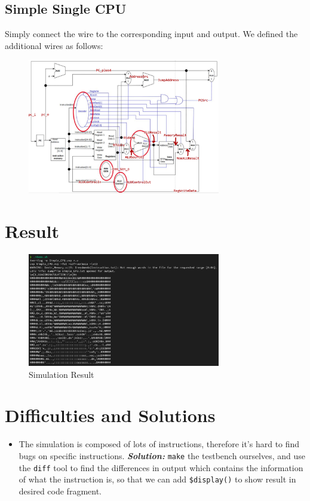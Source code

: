 \documentclass{article}
\begin{document}
\subsection{Simple Single CPU}
Simply connect the wire to the corresponding input and output.
We defined the additional wires as follows:
\begin{figure}[!htb]
    \centering
    \includegraphics[width=0.75\textwidth]{wire.png}
\end{figure}

\newpage

\section{Result}
\begin{figure}[!htb]
    \centering
    \includegraphics[width=0.75\textwidth]{result.png}
    \caption{Simulation Result}
\end{figure}

\section{Difficulties and Solutions}
\begin{itemize}
    \item The simulation is composed of lots of instructions, therefore it's hard to find bugs on specific instructions.
    \textbf{\textit{Solution:}}  \verb|make| the testbench ourselves,  
     and use the \verb|diff| tool to find the differences in output which contains the information of what the instruction is,
     so that we can add \verb|$display()| to show result in desired code fragment.
\end{itemize} 
\end{document}
